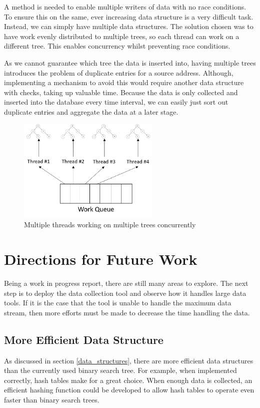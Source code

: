 \documentclass[twocolumn,10pt]{asme2ej}
\begin{document}
A method is needed to enable multiple writers of data with no race conditions. To ensure this on the same, ever increasing data structure is a very difficult task. Instead, we can simply have multiple data structures. The solution chosen was to have work evenly distributed to multiple trees, so each thread can work on a different tree. This enables concurrency whilst preventing race conditions.

As we cannot guarantee which tree the data is inserted into, having multiple trees introduces the problem of duplicate entries for a source address. Although, implementing a mechanism to avoid this would require another data structure with checks, taking up valuable time. Because the data is only collected and inserted into the database every time interval, we can easily just sort out duplicate entries and aggregate the data at a later stage.

\begin{figure}[h]
	\begin{center}
		\includegraphics[width=6.81cm, height=4.95cm]{figures/trees}
	\end{center}
	\caption{Multiple threads working on multiple trees concurrently}
	\label{figure_trees} 
\end{figure}

\section{Directions for Future Work}
Being a work in progress report, there are still many areas to explore. The next step is to deploy the data collection tool and observe how it handles large data tools. If it is the case that the tool is unable to handle the maximum data stream, then more efforts must be made to decrease the time handling the data.

\subsection{More Efficient Data Structure}
As discussed in section \ref{data_structures}, there are more efficient data structures than the currently used binary search tree. For example, when implemented correctly, hash tables make for a great choice. When enough data is collected, an efficient hashing function could be developed to allow hash tables to operate even faster than binary search trees.
\end{document}
